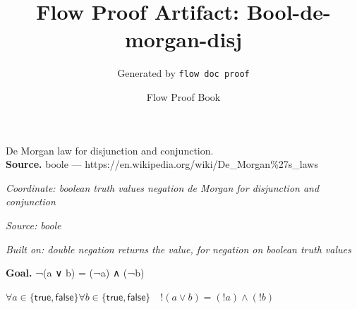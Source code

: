 \documentclass[11pt]{article}
\title{Flow Proof Artifact: Bool-de-morgan-disj}
\author{Generated by \texttt{flow doc proof}}
\date{Flow Proof Book}
\theoremstyle{definition}
\begin{document}
\maketitle
De Morgan law for disjunction and conjunction.\\[0.5em]
\textbf{Source.} boole — https://en.wikipedia.org/wiki/De\_Morgan\%27s\_laws\\[0.5em]
\bigskip
{}\par
\smallskip\noindent\textit{Coordinate: boolean truth values \cdot negation \cdot de Morgan for disjunction and conjunction}\par
\smallskip\noindent\textit{Source: boole}\par
\smallskip\noindent\textit{Built on: double negation returns the value, for negation on boolean truth values}\par
\medskip
\noindent\textbf{Goal.} ¬(a ∨ b) = (¬a) ∧ (¬b)\par
\noindent$\displaystyle \forall a \in \{\mathsf{true}, \mathsf{false}\} \forall b \in \{\mathsf{true}, \mathsf{false}\}\quad !(a \lor b) = (!a) \land (!b)$\par
\medskip
\noindent
\end{document}
